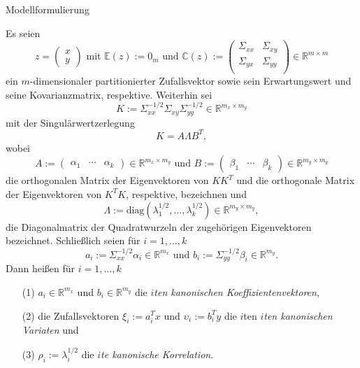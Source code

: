 \documentclass[
  8pt,
  ignorenonframetext,
]{beamer}
\begin{document}
\begin{frame}{Modellformulierung}
\protect\hypertarget{modellformulierung-3}{}
\vspace{1mm}
\footnotesize
\begin{definition}
\justifying
Es seien
\begin{equation}
z = \begin{pmatrix} x \\ y \end{pmatrix}
\mbox{ mit }
\mathbb{E}(z) := 0_m
\mbox{ und }
\mathbb{C}(z) :=
\begin{pmatrix}
\Sigma_{xx} & \Sigma_{xy} \\
\Sigma_{yx} & \Sigma_{yy} \\
\end{pmatrix}
\in \mathbb{R}^{m \times m}
\end{equation}
ein $m$-dimensionaler partitionierter Zufallsvektor sowie sein Erwartungswert
und seine Kovarianzmatrix, respektive. Weiterhin sei
\begin{equation}
K := \Sigma_{xx}^{-1/2}\Sigma_{xy}\Sigma_{yy}^{-1/2} \in \mathbb{R}^{m_x \times m_y}
\end{equation}
mit der Singulärwertzerlegung
\begin{equation}
K = A \Lambda B^T,
\end{equation}
wobei
\begin{equation}
A       := \begin{pmatrix} \alpha_1 & \cdots & \alpha_k \end{pmatrix} \in \mathbb{R}^{m_x \times m_y}
\mbox{ und }
B       := \begin{pmatrix} \beta_1  & \cdots &  \beta_k \end{pmatrix} \in \mathbb{R}^{m_y \times m_y}
\end{equation}
die orthogonalen Matrix der Eigenvektoren von $KK^T$  und die orthogonale Matrix
der Eigenvektoren von $K^TK$, respektive, bezeichnen und
\begin{equation}
\Lambda := \mbox{diag}\left(\lambda^{1/2}_1,...,\lambda_k^{1/2}\right) \in \mathbb{R}^{m_y \times m_y},
\end{equation}
die Diagonalmatrix der Quadratwurzeln der zugehörigen Eigenvektoren bezeichnet.
Schließlich seien für $i = 1,...,k$
\begin{equation}
a_i := \Sigma_{xx}^{-1/2}\alpha_i  \in \mathbb{R}^{m_x} \mbox{ und } b_i := \Sigma_{yy}^{-1/2}\beta_i \in \mathbb{R}^{m_y}.
\end{equation}
Dann heißen für $i = 1,...,k$
\begin{itemize}
\itemsep0mm
\item[(1)] $a_i \in \mathbb{R}^{m_x}$ und $b_i \in \mathbb{R}^{m_y}$ die \textit{$i$ten kanonischen Koeffizientenvektoren},
\item[(2)] die Zufallsvektoren $\xi_i := a_i^Tx$ und $\upsilon_i := b_i^Ty$ die $i$ten \textit{$i$ten kanonischen Variaten} und
\item[(3)] $\rho_i := \lambda_i^{1/2}$ die \textit{$i$te kanonische Korrelation}.
\end{itemize}
\end{definition}
\end{frame}
\end{document}
